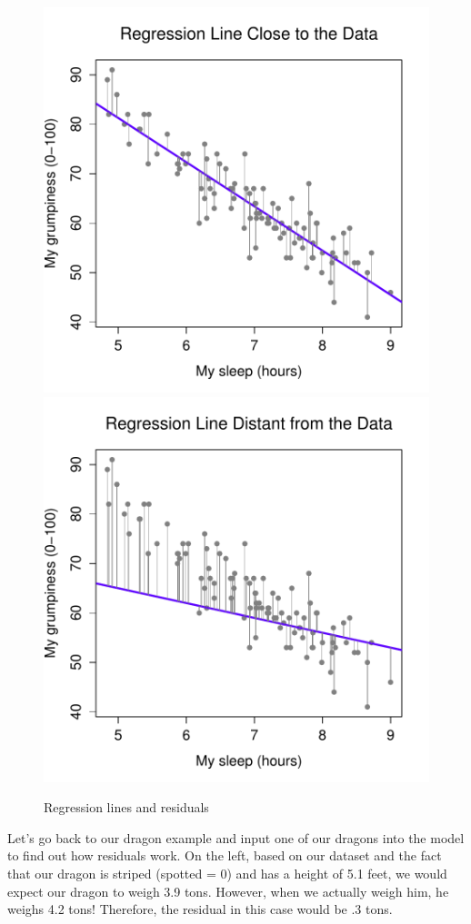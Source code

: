 \documentclass[
]{book}
\begin{document}
\begin{figure}

{\centering \includegraphics[width=0.49\linewidth]{images/13-regression/good-regression-line} \includegraphics[width=0.49\linewidth]{images/13-regression/bad-regression-line} 

}

\caption{Regression lines and residuals}\label{fig:unnamed-chunk-3}
\end{figure}

Let's go back to our dragon example and input one of our dragons into the model to find out how residuals work. On the left, based on our dataset and the fact that our dragon is striped (spotted = 0) and has a height of 5.1 feet, we would expect our dragon to weigh 3.9 tons. However, when we actually weigh him, he weighs 4.2 tons! Therefore, the residual in this case would be .3 tons.
\end{document}
